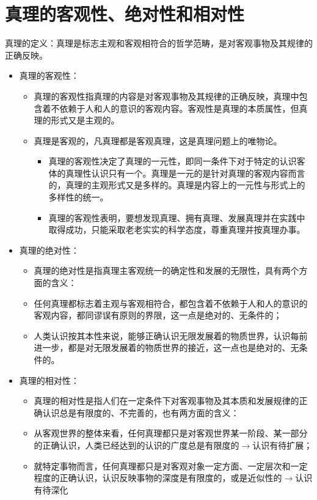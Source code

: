\documentclass[12pt,openany]{ctexbook}
\begin{document}
\section{真理的客观性、绝对性和相对性}
\begin{mdquote}
真理的定义：真理是标志主观和客观相符合的哲学范畴，是对客观事物及其规律的正确反映。
\end{mdquote}
\begin{itemize}
  \item 真理的客观性：
\begin{itemize}
  \item 真理的客观性指真理的内容是对客观事物及其规律的正确反映，真理中包含着不依赖于人和人的意识的客观内容。客观性是真理的本质属性，但真理的形式又是主观的。
  \item 真理是客观的，凡真理都是客观真理，这是真理问题上的唯物论。
\begin{itemize}
  \item 真理的客观性决定了真理的一元性，即同一条件下对于特定的认识客体的真理性认识只有一个。真理是一元的是针对真理的客观内容而言的，真理的主观形式又是多样的。真理是内容上的一元性与形式上的多样性的统一。
  \item 真理的客观性表明，要想发现真理、拥有真理、发展真理并在实践中取得成功，只能采取老老实实的科学态度，尊重真理并按真理办事。
\end{itemize}
\end{itemize}
  \item 真理的绝对性：
\begin{itemize}
  \item 真理的绝对性是指真理主客观统一的确定性和发展的无限性，具有两个方面的含义：
  \item 任何真理都标志着主观与客观相符合，都包含着不依赖于人和人的意识的客观内容，都同谬误有原则的界限，这一点是绝对的、无条件的；
  \item 人类认识按其本性来说，能够正确认识无限发展着的物质世界，认识每前进一步，都是对无限发展着的物质世界的接近，这一点也是绝对的、无条件的。
\end{itemize}
  \item 真理的相对性：
\begin{itemize}
  \item 真理的相对性是指人们在一定条件下对客观事物及其本质和发展规律的正确认识总是有限度的、不完善的，也有两方面的含义：
  \item 从客观世界的整体来看，任何真理都只是对客观世界某一阶段、某一部分的正确认识，人类已经达到的认识的广度总是有限度的$\to$认识有待扩展；
  \item 就特定事物而言，任何真理都只是对客观对象一定方面、一定层次和一定程度的正确认识，认识反映事物的深度是有限度的，或是近似性的$\to$认识有待深化

\end{itemize}
\end{itemize}
\end{document}
